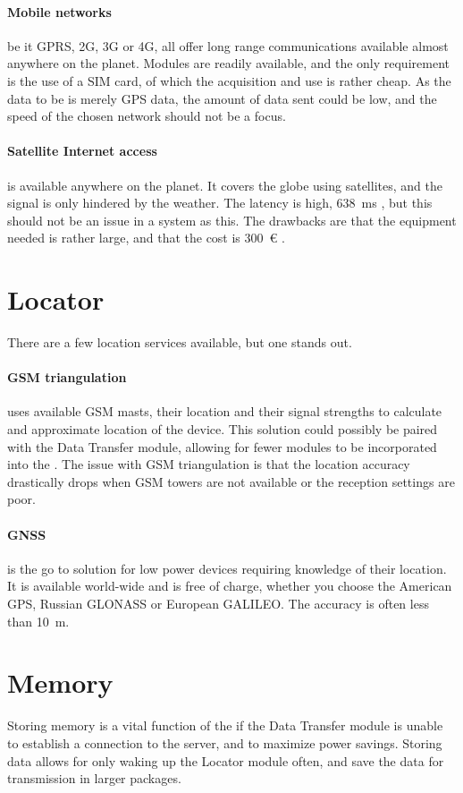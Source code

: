 \paragraph{Mobile networks} be it GPRS, 2G, 3G or 4G, all offer long range communications available almost anywhere on the planet.
Modules are readily available, and the only requirement is the use of a SIM card, of which the acquisition and use is rather cheap.
As the data to be is merely GPS data, the amount of data sent could be low, and the speed of the chosen network should not be a focus.
\paragraph{Satellite Internet access} is available anywhere on the planet.
It covers the globe using satellites, and the signal is only hindered by the weather.
The latency is high, \SI{638}{\milli\second} \cite{wiki:satellite}, but this should not be an issue in a system as this.
The drawbacks are that the equipment needed is rather large, and that the cost is \SI{300}{€} \cite{wiki:satellite}.

\section{Locator}
There are a few location services available, but one stands out.
\paragraph{GSM triangulation} uses available GSM masts, their location and their signal strengths to calculate and approximate location of the device.
This solution could possibly be paired with the Data Transfer module, allowing for fewer modules to be incorporated into the \systemName.
The issue with GSM triangulation is that the location accuracy drastically drops when GSM towers are not available or the reception settings are poor.
\paragraph{GNSS} is the go to solution for low power devices requiring knowledge of their location.
It is available world-wide and is free of charge, whether you choose the American GPS, Russian GLONASS or European GALILEO.
The accuracy is often less than \SI{10}{\metre}.

\section{Memory}
Storing memory is a vital function of the \systemName if the Data Transfer module is unable to establish a connection to the server, and to maximize power savings.
Storing data allows for only waking up the Locator module often, and save the data for transmission in larger packages.
